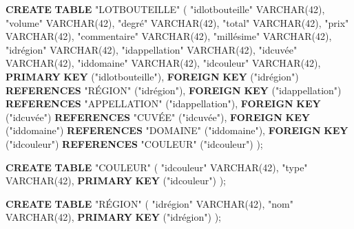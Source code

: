 \documentclass[11pt]{article}
\newenvironment{Shaded}{}{}
\newcommand{\KeywordTok}[1]{\textcolor[rgb]{0.00,0.44,0.13}{\textbf{{#1}}}}
\newcommand{\DataTypeTok}[1]{\textcolor[rgb]{0.56,0.13,0.00}{{#1}}}
\newcommand{\DecValTok}[1]{\textcolor[rgb]{0.25,0.63,0.44}{{#1}}}
\newcommand{\OtherTok}[1]{\textcolor[rgb]{0.00,0.44,0.13}{{#1}}}
\newcommand{\NormalTok}[1]{{#1}}
\begin{document}
\begin{Shaded}
\begin{Highlighting}[]
\KeywordTok{CREATE} \KeywordTok{TABLE} \OtherTok{"LOTBOUTEILLE"}\NormalTok{ (}
  \OtherTok{"idlotbouteille"} \DataTypeTok{VARCHAR}\NormalTok{(}\DecValTok{42}\NormalTok{),}
  \OtherTok{"volume"} \DataTypeTok{VARCHAR}\NormalTok{(}\DecValTok{42}\NormalTok{),}
  \OtherTok{"degré"} \DataTypeTok{VARCHAR}\NormalTok{(}\DecValTok{42}\NormalTok{),}
  \OtherTok{"total"} \DataTypeTok{VARCHAR}\NormalTok{(}\DecValTok{42}\NormalTok{),}
  \OtherTok{"prix"} \DataTypeTok{VARCHAR}\NormalTok{(}\DecValTok{42}\NormalTok{),}
  \OtherTok{"commentaire"} \DataTypeTok{VARCHAR}\NormalTok{(}\DecValTok{42}\NormalTok{),}
  \OtherTok{"millésime"} \DataTypeTok{VARCHAR}\NormalTok{(}\DecValTok{42}\NormalTok{),}
  \OtherTok{"idrégion"} \DataTypeTok{VARCHAR}\NormalTok{(}\DecValTok{42}\NormalTok{),}
  \OtherTok{"idappellation"} \DataTypeTok{VARCHAR}\NormalTok{(}\DecValTok{42}\NormalTok{),}
  \OtherTok{"idcuvée"} \DataTypeTok{VARCHAR}\NormalTok{(}\DecValTok{42}\NormalTok{),}
  \OtherTok{"iddomaine"} \DataTypeTok{VARCHAR}\NormalTok{(}\DecValTok{42}\NormalTok{),}
  \OtherTok{"idcouleur"} \DataTypeTok{VARCHAR}\NormalTok{(}\DecValTok{42}\NormalTok{),}
  \KeywordTok{PRIMARY} \KeywordTok{KEY}\NormalTok{ (}\OtherTok{"idlotbouteille"}\NormalTok{),}
  \KeywordTok{FOREIGN} \KeywordTok{KEY}\NormalTok{ (}\OtherTok{"idrégion"}\NormalTok{) }\KeywordTok{REFERENCES} \OtherTok{"RÉGION"}\NormalTok{ (}\OtherTok{"idrégion"}\NormalTok{),}
  \KeywordTok{FOREIGN} \KeywordTok{KEY}\NormalTok{ (}\OtherTok{"idappellation"}\NormalTok{) }\KeywordTok{REFERENCES} \OtherTok{"APPELLATION"}\NormalTok{ (}\OtherTok{"idappellation"}\NormalTok{),}
  \KeywordTok{FOREIGN} \KeywordTok{KEY}\NormalTok{ (}\OtherTok{"idcuvée"}\NormalTok{) }\KeywordTok{REFERENCES} \OtherTok{"CUVÉE"}\NormalTok{ (}\OtherTok{"idcuvée"}\NormalTok{),}
  \KeywordTok{FOREIGN} \KeywordTok{KEY}\NormalTok{ (}\OtherTok{"iddomaine"}\NormalTok{) }\KeywordTok{REFERENCES} \OtherTok{"DOMAINE"}\NormalTok{ (}\OtherTok{"iddomaine"}\NormalTok{),}
  \KeywordTok{FOREIGN} \KeywordTok{KEY}\NormalTok{ (}\OtherTok{"idcouleur"}\NormalTok{) }\KeywordTok{REFERENCES} \OtherTok{"COULEUR"}\NormalTok{ (}\OtherTok{"idcouleur"}\NormalTok{)}
\NormalTok{);}

\KeywordTok{CREATE} \KeywordTok{TABLE} \OtherTok{"COULEUR"}\NormalTok{ (}
  \OtherTok{"idcouleur"} \DataTypeTok{VARCHAR}\NormalTok{(}\DecValTok{42}\NormalTok{),}
  \OtherTok{"type"} \DataTypeTok{VARCHAR}\NormalTok{(}\DecValTok{42}\NormalTok{),}
  \KeywordTok{PRIMARY} \KeywordTok{KEY}\NormalTok{ (}\OtherTok{"idcouleur"}\NormalTok{)}
\NormalTok{);}

\KeywordTok{CREATE} \KeywordTok{TABLE} \OtherTok{"RÉGION"}\NormalTok{ (}
  \OtherTok{"idrégion"} \DataTypeTok{VARCHAR}\NormalTok{(}\DecValTok{42}\NormalTok{),}
  \OtherTok{"nom"} \DataTypeTok{VARCHAR}\NormalTok{(}\DecValTok{42}\NormalTok{),}
  \KeywordTok{PRIMARY} \KeywordTok{KEY}\NormalTok{ (}\OtherTok{"idrégion"}\NormalTok{)}
\NormalTok{);}


\end{Highlighting}
\end{Shaded}
\end{document}

